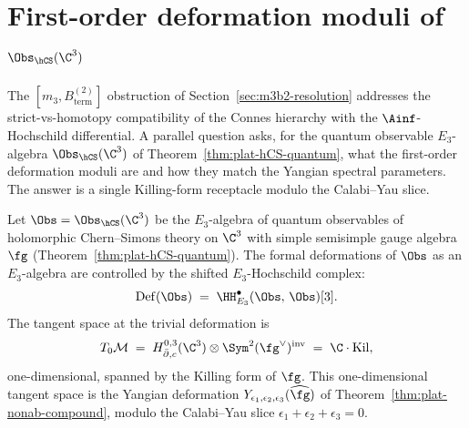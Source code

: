\section{First-order deformation moduli of \texorpdfstring{$\Obs_{\hCS}(\C^3)$}{Obs-hCS(C-3)}}
\label{sec:m3b2-first-order-deformation-moduli}

The $[m_3, B^{(2)}_{\mathrm{term}}]$ obstruction of Section~\ref{sec:m3b2-resolution}
addresses the strict-vs-homotopy compatibility of the Connes hierarchy
with the $\Ainf$-Hochschild differential. A parallel question asks,
for the quantum observable $E_3$-algebra $\Obs_{\hCS}(\C^3)$ of
Theorem~\ref{thm:plat-hCS-quantum}, what the first-order deformation
moduli are and how they match the Yangian spectral parameters. The
answer is a single Killing-form receptacle modulo the Calabi--Yau
slice.

\begin{theorem}
\label{thm:plat-first-order-moduli}
Let $\Obs = \Obs_{\hCS}(\C^3)$ be the $E_3$-algebra of quantum
observables of holomorphic Chern--Simons theory on $\C^3$ with simple
semisimple gauge algebra $\fg$ (Theorem~\ref{thm:plat-hCS-quantum}). The
formal deformations of $\Obs$ as an $E_3$-algebra are controlled by the
shifted $E_3$-Hochschild complex:
\[
 \mathrm{Def}(\Obs)
 \;=\;
 \HH^\bullet_{E_3}(\Obs,\, \Obs)[3].
\]
The tangent space at the trivial deformation is
\[
 T_0 \mathcal{M}
 \;=\;
 H^{0,3}_{\bar\partial, c}(\C^3)
 \otimes \Sym^2(\fg^\vee)^{\mathrm{inv}}
 \;=\;
 \C \cdot \mathrm{Kil},
\]
one-dimensional, spanned by the Killing form of $\fg$. This
one-dimensional tangent space is the Yangian deformation
$Y_{\epsilon_1, \epsilon_2, \epsilon_3}(\widehat\fg)$ of
Theorem~\ref{thm:plat-nonab-compound}, modulo the Calabi--Yau slice
$\epsilon_1 + \epsilon_2 + \epsilon_3 = 0$.
\end{theorem}

